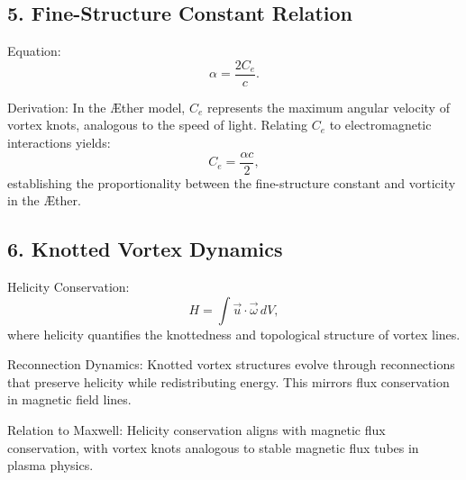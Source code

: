         \subsection*{5. Fine-Structure Constant Relation}
        Equation:
        \begin{equation*}
            \alpha = \frac{2C_e}{c}.
        \end{equation*}

        Derivation:
        In the Æther model, $C_e$ represents the maximum angular velocity of vortex knots, analogous to the speed of light. Relating $C_e$ to electromagnetic interactions yields:
        \begin{equation*}
            C_e = \frac{\alpha c}{2},
        \end{equation*}
        establishing the proportionality between the fine-structure constant and vorticity in the Æther.

        \subsection*{6. Knotted Vortex Dynamics}
        Helicity Conservation:
        \begin{equation*}
            H = \int \vec{u} \cdot \vec{\omega} \, dV,
        \end{equation*}
        where helicity quantifies the knottedness and topological structure of vortex lines.

        Reconnection Dynamics:
        Knotted vortex structures evolve through reconnections that preserve helicity while redistributing energy. This mirrors flux conservation in magnetic field lines.

        Relation to Maxwell:
        Helicity conservation aligns with magnetic flux conservation, with vortex knots analogous to stable magnetic flux tubes in plasma physics.


